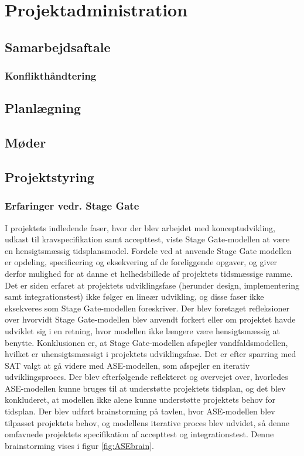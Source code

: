 \chapter{Projektadministration}

\section{Samarbejdsaftale}

	\subsection{Konflikthåndtering}

\section{Planlægning}
\section{Møder}
\section{Projektstyring}

	\subsection{Erfaringer vedr. Stage Gate}

	I projektets indledende faser, hvor der blev arbejdet med konceptudvikling, udkast til kravspecifikation samt accepttest, viste Stage Gate-modellen at være en hensigtsmæssig tidsplansmodel. Fordele ved at anvende Stage Gate modellen er opdeling, specificering og eksekvering af de foreliggende opgaver, og giver derfor mulighed for at danne et helhedsbillede af projektets tidsmæssige ramme. Det er siden erfaret at projektets udviklingsfase (herunder design, implementering samt integrationstest) ikke følger en lineær udvikling, og disse faser ikke eksekveres som Stage Gate-modellen foreskriver. Der blev foretaget refleksioner over hvorvidt Stage Gate-modellen blev anvendt forkert eller om projektet havde udviklet sig i en retning, hvor modellen ikke længere være hensigtsmæssig at benytte. Konklusionen er, at Stage Gate-modellen afspejler vandfaldsmodellen, hvilket er uhensigtsmæssigt i projektets udviklingsfase. Det er efter sparring med SAT valgt at gå videre med ASE-modellen, som afspejler en iterativ udviklingsproces. Der blev efterfølgende reflekteret og overvejet over, hvorledes ASE-modellen kunne bruges til at understøtte projektets tidsplan, og det blev konkluderet, at modellen ikke alene kunne understøtte projektets behov for tidsplan. Der blev udført brainstorming på tavlen, hvor ASE-modellen blev tilpasset projektets behov, og modellens iterative proces blev udvidet, så denne omfavnede projektets specifikation af accepttest og integrationstest. Denne brainstorming vises i figur \ref{fig:ASEbrain}.  
	
